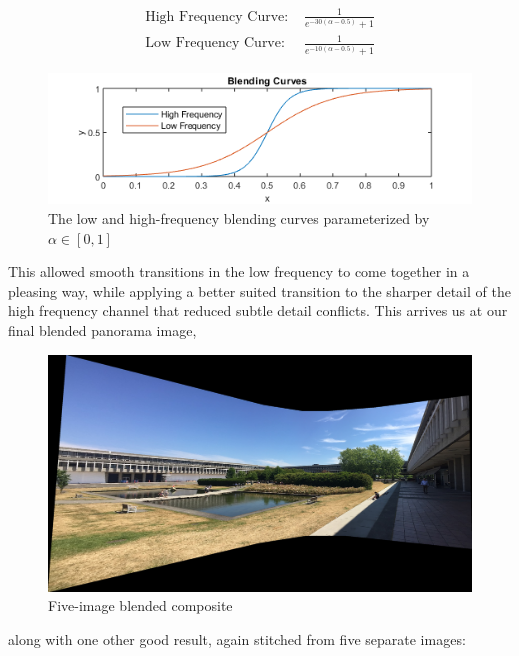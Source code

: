 \documentclass[]{article}
\begin{document}
\begin{align*}
\textrm{High Frequency Curve: }&\frac{1}{e^{-30(\alpha-0.5)} + 1} \\
\textrm{Low Frequency Curve: }&\frac{1}{e^{-10(\alpha-0.5)} + 1}
\end{align*}

\begin{figure}[h]
	\includegraphics[scale=1]{results/blending_curves}
	\centering
	\caption{The low and high-frequency blending curves parameterized by $\alpha \in [0,1]$}
\end{figure}

This allowed smooth transitions in the low frequency to come together in a pleasing way, while applying a better suited transition to the sharper detail of the high frequency channel that reduced subtle detail conflicts. This arrives us at our final blended panorama image,
\vspace{50mm}

\begin{figure}[!h]
	\includegraphics[scale=0.2]{results/p1_blend/16}
	\centering
	\caption{Five-image blended composite}
\end{figure}

\noindent along with one other good result, again stitched from five separate images:
\end{document}
